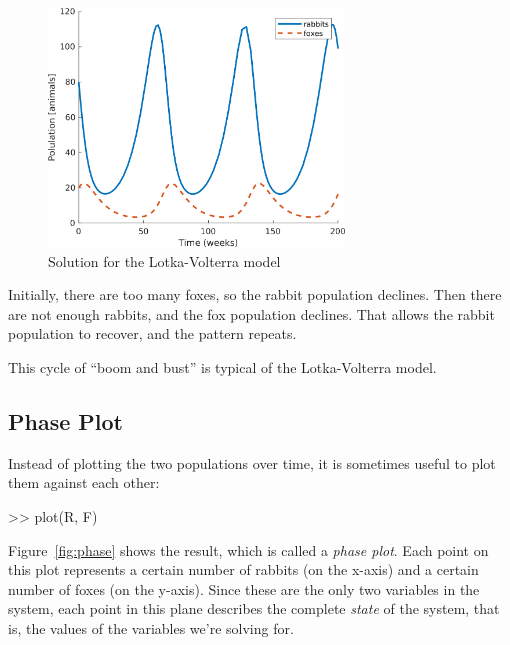 \begin{figure}[h]
\centerline{\includegraphics[width=0.7\textwidth]{../code/chap10/lotka_time.png}}
\caption{Solution for the Lotka-Volterra model}
\label{fig:lotka}
\end{figure}


Initially, there are too many foxes, so the rabbit population declines.  Then there are not enough rabbits, and the fox population declines.  That allows the rabbit population to recover, and the pattern repeats.

This cycle of ``boom and bust'' is typical of the Lotka-Volterra model.


\subsection{Phase Plot}

Instead of plotting the two populations over time, it is sometimes useful to plot them against each other:

\begin{code}
>> plot(R, F)
\end{code}

Figure~\ref{fig:phase} shows the result, which is called a \emph{phase plot}.
Each point on this plot represents a certain number of rabbits (on the
x-axis) and a certain number of foxes (on the y-axis).
Since these are the only two variables in the system, each point in
this plane describes the complete \emph{state} of the system, that is, the values of
the variables we're solving for.

